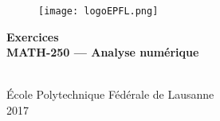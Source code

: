 
\begin{titlepage}
\begin{center}



\vfill


\begin{figure}[!ht]
\centering
\texttt{[image: logoEPFL.png]}
\end{figure}







{ \bfseries Exercices }
\hrulefill\\[0.5cm]
\large{\textbf{MATH-250 --- Analyse numérique}} \\
\hrulefill\\[0.5cm]


\vfill
\vfill

	






\'Ecole Polytechnique F\'ed\'erale de Lausanne
$\,$\\
2017\\
$\,$\\
\end{center}

\end{titlepage}


